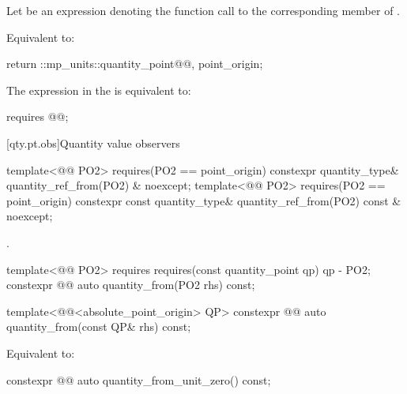 \begin{itemdescr}
\pnum
Let  be an expression denoting
the function call to the corresponding member of .

\pnum
\effects
Equivalent to:
\begin{codeblock}
return ::mp_units::quantity_point{@@, point_origin};
\end{codeblock}

\pnum
\remarks
The expression in the  is equivalent to:
\begin{codeblock}
requires { @@; }
\end{codeblock}
\end{itemdescr}

[qty.pt.obs]{Quantity value observers}

\begin{itemdecl}
template<@@ PO2>
  requires(PO2{} == point_origin)
constexpr quantity_type& quantity_ref_from(PO2) & noexcept;
template<@@ PO2>
  requires(PO2{} == point_origin)
constexpr const quantity_type& quantity_ref_from(PO2) const & noexcept;
\end{itemdecl}

\begin{itemdescr}
\pnum
\returns
{}.
\end{itemdescr}

\begin{itemdecl}
template<@@ PO2>
  requires requires(const quantity_point qp) { qp - PO2{}; }
constexpr @@ auto quantity_from(PO2 rhs) const;

template<@@<absolute_point_origin> QP>
constexpr @@ auto quantity_from(const QP& rhs) const;
\end{itemdecl}

\begin{itemdescr}
\pnum
\effects
Equivalent to:
\end{itemdescr}

\begin{itemdecl}
constexpr @@ auto quantity_from_unit_zero() const;
\end{itemdecl}

